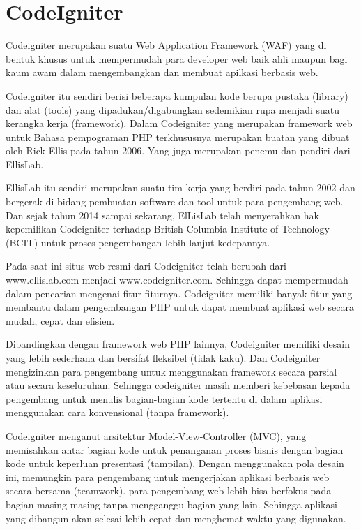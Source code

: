 \section{CodeIgniter}
Codeigniter merupakan suatu Web Application Framework (WAF) yang di bentuk khusus untuk mempermudah para developer web baik ahli maupun bagi kaum awam dalam mengembangkan dan membuat apilkasi berbasis web.
\par
Codeigniter itu sendiri berisi beberapa kumpulan kode berupa pustaka (library) dan alat (tools) yang dipadukan/digabungkan sedemikian rupa menjadi suatu kerangka kerja (framework). Dalam Codeigniter yang merupakan framework web untuk Bahasa pempograman PHP terkhususnya merupakan buatan yang dibuat oleh Rick Ellis pada tahun 2006. Yang juga merupakan penemu dan pendiri dari EllisLab.
\par
EllisLab itu sendiri merupakan suatu tim kerja yang berdiri pada tahun 2002 dan bergerak di bidang pembuatan software dan tool untuk para pengembang web. Dan sejak tahun 2014 sampai sekarang, ElLisLab telah menyerahkan hak kepemilikan Codeigniter terhadap British Columbia Institute of Technology (BCIT) untuk proses pengembangan lebih lanjut kedepannya.
\par
Pada saat ini situs web resmi dari Codeigniter telah berubah dari www.ellislab.com menjadi www.codeigniter.com. Sehingga dapat mempermudah dalam pencarian mengenai fitur-fiturnya. Codeigniter memiliki banyak fitur  yang membantu dalam pengembangan PHP untuk dapat membuat aplikasi web secara mudah, cepat dan efisien.
\par
Dibandingkan dengan framework web PHP lainnya, Codeigniter memiliki desain yang lebih sederhana dan bersifat fleksibel (tidak kaku). Dan Codeigniter mengizinkan para pengembang untuk menggunakan framework secara parsial atau secara keseluruhan. Sehingga codeigniter masih memberi kebebasan kepada pengembang untuk menulis bagian-bagian kode tertentu di dalam aplikasi menggunakan cara konvensional (tanpa framework).
\par
Codeigniter menganut arsitektur Model-View-Controller (MVC), yang memisahkan antar bagian kode untuk penanganan proses bisnis dengan bagian kode untuk keperluan presentasi (tampilan). Dengan menggunakan pola desain ini, memungkin para pengembang untuk mengerjakan aplikasi berbasis web secara bersama (teamwork). para pengembang web lebih bisa berfokus pada bagian masing-masing tanpa mengganggu bagian yang lain. Sehingga aplikasi yang dibangun akan selesai lebih cepat dan menghemat waktu yang digunakan. 

